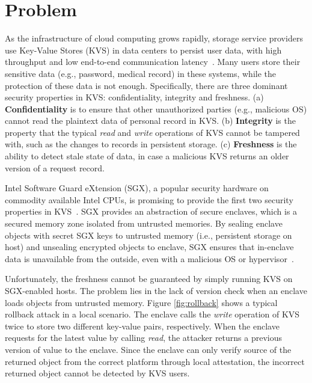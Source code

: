 \section{Problem}\label{problem}

As the infrastructure of cloud computing grows rapidly, storage service providers use Key-Value Stores (KVS) 
in data centers to persist user data, with high throughput and low end-to-end communication latency~\cite{}.
Many users store their sensitive data (e.g., password, medical record) in these systems, while the protection 
of these data is not enough. 
Specifically, there are three dominant security properties in KVS: confidentiality, integrity and freshness.
(a) \textbf{Confidentiality} is to ensure that other unauthorized parties (e.g., malicious OS) cannot read the plaintext 
data of personal record in KVS. (b) \textbf{Integrity} is the property that the typical \textit{read} and \textit{write} 
operations of KVS cannot be tampered with, such as the changes to records in persistent storage. (c) \textbf{Freshness}
is the ability to detect stale state of data, in case a malicious KVS returns an older version of a request record.

Intel Software Guard eXtension (SGX), a popular security hardware on commodity available Intel CPUs, is promising 
to provide the first two security properties in KVS~\cite{}. SGX provides an abstraction of secure enclaves, which is a secured 
memory zone isolated from untrusted memories. By sealing enclave objects with secret SGX keys to untrusted memory (i.e., 
persistent storage on host) and unsealing encrypted objects to enclave, SGX ensures that in-enclave data is unavailable 
from the outside, even with a malicious OS or hypervisor~\cite{}.

Unfortunately, the freshness cannot be guaranteed by simply running KVS on SGX-enabled hosts. 
The problem lies in the lack of version check when an enclave loads objects from untrusted memory.
Figure \ref{fig:rollback} shows a typical rollback attack in a local scenario. The enclave calls the \textit{write} 
operation of KVS twice to store two different key-value pairs, respectively. When the enclave
requests for the latest value by calling \textit{read}, the attacker returns a previous version of value 
to the enclave. Since the enclave can only verify source of the returned object from the correct platform
through local attestation, the incorrect returned object cannot be detected by KVS users.

